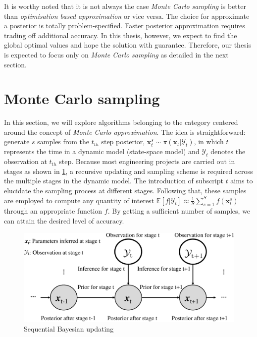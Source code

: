 It is worthy noted that it is not always the case \textit{Monte Carlo sampling} is better than \textit{optimisation based approximation} or vice versa. The choice for approximate a posterior is totally problem-specified. Faster posterior approximation requires trading off additional accuracy. In this thesis, however, we expect to find the global optimal values and hope the solution with guarantee. Therefore, our thesis is expected to focus only on \textit{Monte Carlo sampling} as detailed in the next section.

\section{Monte Carlo sampling}
In this section, we will explore algorithms belonging to the category centered around the concept of \textit{Monte Carlo approximation}. The idea is straightforward: generate $s$ samples from the $t_{th}$ step posterior, $\boldsymbol{x}_{t}^{s} \sim  \pi(\boldsymbol{x}_{t}|\mathcal{Y}_{t})$, in which $t$ represents the time in a dynamic model (state-space model) and $\mathcal{Y}_{t}$ denotes the observation at $t_{th}$ step. Because most engineering projects are carried out in stages as shown in \cref{fig: Sequential Bayesian}, a recursive updating and sampling scheme is required across the multiple stages in the dynamic model. The introduction of subscript $t$ aims to elucidate the sampling process at different stages. Following that, these samples are employed to compute any quantity of interest $\mathbb{E}[ f|\mathcal{Y}_{t}] \approx \frac{1}{S} \sum_{s=1}^{S}f(\boldsymbol{x}_{t}^{s})$ through an appropriate function $f$. By getting a sufficient number of samples, we can attain the desired level of accuracy.
\begin{figure}[htbp]
    \centering
    \includegraphics[width = 140mm]{Figures/figures-Sequential_Bayesian.pdf}
    \caption{Sequential Bayesian updating}
    \label{fig: Sequential Bayesian}
\end{figure}
